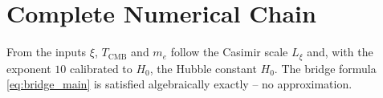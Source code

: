 \section{Complete Numerical Chain}
\label{sec:numerical}

\begin{table}[H]
    \centering
    \caption{Numerical verification of the complete chain}
    \label{tab:numerical}
\end{table}

\begin{foundation}
    From the inputs $\xi$, $T_\text{CMB}$ and $m_e$ follow the Casimir scale
    $L_\xi$ and, with the exponent $10$ calibrated to $H_0$, the Hubble
    constant $H_0$. The bridge formula \eqref{eq:bridge_main}
    is satisfied algebraically exactly -- no approximation.
\end{foundation}

